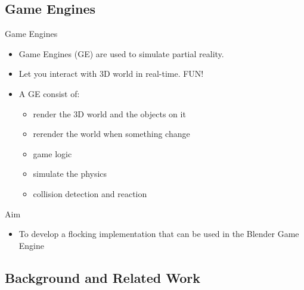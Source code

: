 \documentclass[red]{beamer}
\begin{document}
\subsection{Game Engines}
\begin{frame}{Game Engines}
	\begin{itemize}
		\pause \item Game Engines (GE) are used to simulate partial reality.
		\pause \item Let you interact with 3D world in real-time. \pause FUN!
		\pause \item A GE consist of:
			\begin{itemize}
				\pause \item render the 3D world and the objects on it
				\pause \item rerender the world when something change
				\pause \item game logic
				\pause \item simulate the physics
				\pause \item collision detection and reaction
			\end{itemize}
	\end{itemize}
\end{frame}

\begin{frame}{Aim}
	\begin{itemize}
		\pause \item To develop a flocking implementation that can be used in the Blender Game Engine
	\end{itemize}
\end{frame}


\subsection{Background and Related Work}

\end{document}
